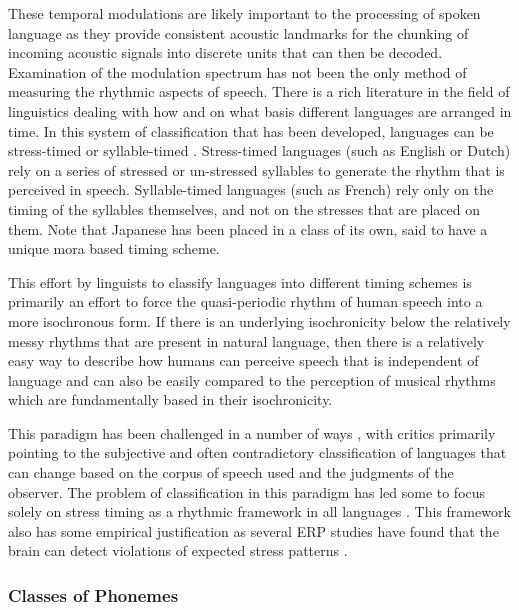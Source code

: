 \documentclass[titlepage]{article}
\begin{document}
    These temporal modulations are likely important to the processing of 
    spoken language as they provide consistent acoustic landmarks for the 
    chunking of incoming acoustic signals into discrete units that can then be 
    decoded. Examination of the modulation spectrum has not been the only 
    method of measuring the rhythmic 
    aspects of speech. There is a rich literature in the field of linguistics 
    dealing with how and on what basis different languages are arranged in time.
    In this system of classification that has been developed, languages can be 
    stress-timed or syllable-timed \cite{Nakatani1981,Dauer1983}. Stress-timed 
    languages (such as English or Dutch) rely on a series of stressed or 
    un-stressed syllables to generate the rhythm that is perceived in speech. 
    Syllable-timed languages (such as French) rely only on the timing of the 
    syllables themselves, and not on the stresses that are placed on them. Note
    that Japanese has been placed in a class of its own, said to have a unique 
    mora based timing scheme.

    This effort by linguists to classify languages into different timing 
    schemes is primarily an effort to force the quasi-periodic rhythm of human 
    speech into a more isochronous form. If there is an underlying isochronicity
    below the relatively messy rhythms that are present in natural language, 
    then there is a relatively easy way to describe how humans can perceive 
    speech that is independent of language and can also be easily compared to 
    the perception of musical rhythms which are fundamentally based in their 
    isochronicity. 

    This paradigm has been challenged in a number of ways 
    \cite{Ramus2000,Grabe2002}, with critics primarily pointing to the 
    subjective and often contradictory classification of languages that can 
    change based on the corpus of speech used and the judgments of the 
    observer. The problem of classification in this paradigm has led some 
    to focus solely on stress timing as a rhythmic framework in all languages 
    \cite{Hayes198433,Martin1972}. This framework also has some empirical 
    justification as several ERP studies have found that the brain can detect 
    violations of expected stress patterns 
    \cite{Rothermich2012,Knaus2007,Haegens2018}.
    
    \subsubsection{Classes of Phonemes}
\end{document}
